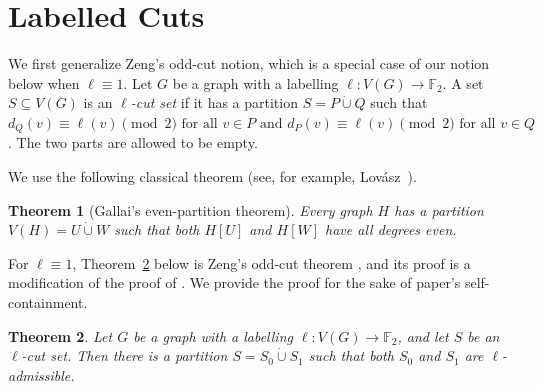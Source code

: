 \documentclass[11pt]{article}
\newtheorem{theorem}{Theorem}
\theoremstyle{definition}
\theoremstyle{remark}
\newcommand{\dotcupop}{\mathbin{\dot\cup}}
\newcommand{\F}{\mathbb{F}}
\newcommand{\1}{\mathbf{1}}
\begin{document}
	\section{Labelled Cuts}\label{sec:labelled}
	
	We first generalize Zeng's odd-cut notion, which is a special case of our notion below when $\ell\equiv 1$. Let $G$ be a graph with a labelling $\ell:V(G)\to\F_2$.  A set $S\subseteq V(G)$ is an \emph{$\ell$-cut set} if it has a partition $S=P\dotcupop Q$ such that $d_Q(v) \equiv \ell(v)\pmod 2 \mbox{ for all } v\in P \mbox{ and } d_P(v) \equiv \ell(v)\pmod 2 \mbox{ for all } v\in Q$. The two parts are allowed to be empty.
	
	
	We use the following classical theorem (see, for example,
	Lov\'asz~\cite[Problem~5.17]{Lovasz}).
	
	\begin{theorem}[Gallai's even-partition theorem]\label{thm:gallai}
		Every graph $H$ has a partition $V(H)=U\dotcupop W$ such that both $H[U]$
		and $H[W]$ have all degrees even.
	\end{theorem}
	
	For $\ell\equiv 1$, Theorem~\ref{thm:labelled-cut} below is Zeng's odd-cut theorem
	\cite[Theorem~1.2]{Zeng}, and its proof is a modification of the proof of \cite[Theorem~1.2]{Zeng}.
	We provide the proof for the sake of paper's self-containment. 
	
	\begin{theorem}\label{thm:labelled-cut}
		Let $G$ be a graph with a labelling $\ell:V(G)\to\F_2$, and let $S$ be an
		$\ell$-cut set.  Then there is a partition
		$
		S=S_0\dotcupop S_1
		$
		such that both $S_0$ and $S_1$ are $\ell$-admissible. 
	\end{theorem}
	
\end{document}
